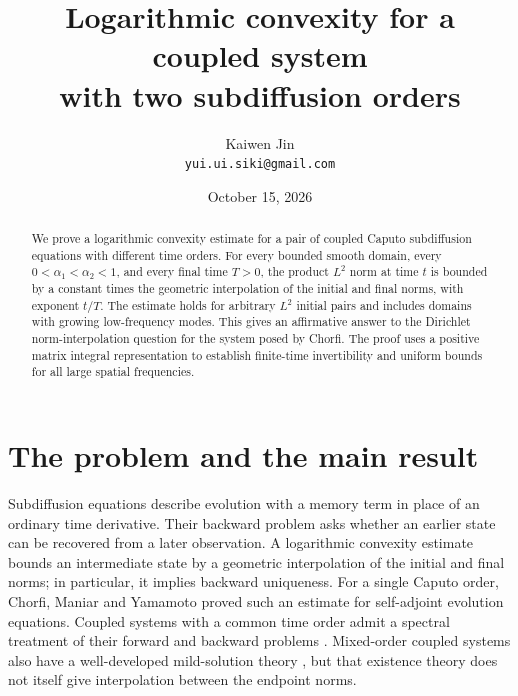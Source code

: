 \documentclass[11pt]{article}
\title{Logarithmic convexity for a coupled system\\with two subdiffusion orders}
\author{Kaiwen Jin\\\small\texttt{yui.ui.siki@gmail.com}}
\date{October 15, 2026}
\begin{document}
\maketitle
\begin{abstract}
We prove a logarithmic convexity estimate for a pair of coupled Caputo
subdiffusion equations with different time orders. For every bounded smooth
domain, every $0<\alpha_1<\alpha_2<1$, and every final time $T>0$, the product
$L^2$ norm at time $t$ is bounded by a constant times the geometric
interpolation of the initial and final norms, with exponent $t/T$.
The estimate holds for arbitrary $L^2$ initial pairs and includes domains
with growing low-frequency modes. This gives an affirmative answer to the
Dirichlet norm-interpolation question for the system posed by Chorfi.
The proof uses a positive matrix integral representation to establish
finite-time invertibility and uniform bounds for all large spatial
frequencies.
\end{abstract}

\section{The problem and the main result}\label{sec:main}
Subdiffusion equations describe evolution with a memory term in place of an
ordinary time derivative. Their backward problem asks whether an earlier
state can be recovered from a later observation. A logarithmic convexity
estimate bounds an intermediate state by a geometric interpolation of the
initial and final norms; in particular, it implies backward uniqueness.
For a single Caputo order, Chorfi, Maniar and Yamamoto
\cite[Theorem 1.1]{CMY} proved such an estimate for self-adjoint evolution
equations. Coupled systems with a common time order admit a spectral treatment
of their forward and backward problems \cite{FLL}. Mixed-order coupled
systems also have a well-developed mild-solution theory \cite{LHL}, but that
existence theory does not itself give interpolation between the endpoint
norms.
\end{document}
